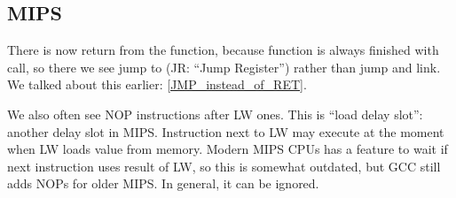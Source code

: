 \ifx\RUSSIAN\undefined
\subsection{MIPS}



There is now return from the function, because function is always finished with \puts call,
so there we see jump to \puts (JR: ``Jump Register'') rather than jump and link.
We talked about this earlier: \ref{JMP_instead_of_RET}.

We also often see NOP instructions after LW ones. This is ``load delay slot'': another delay slot in MIPS.
Instruction next to LW may execute at the moment when LW loads value from memory. 
Modern MIPS CPUs has a feature to wait if next instruction uses result of LW, so this is somewhat outdated,
but GCC still adds NOPs for older MIPS. 
In general, it can be ignored.

\fi
